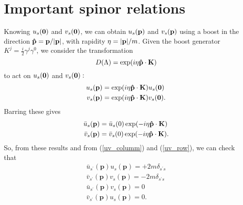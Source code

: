 \section{Important spinor relations}
Knowing $u_s(\vb{0})$ and $v_s(\vb{0})$, we can obtain $u_s(\vb{p})$ and $v_s(\vb{p})$ using a boost in the direction $\vu{p}=\vb{p}/\abs{\vb{p}}$, with rapidity $\eta=\abs{\vb{p}}/m$. Given the boost generator $K^j=\frac{i}{2}\gamma^j\gamma^0$, we consider the transformation
\begin{equation}
    D(\Lambda)=\exp(i\eta\vu{p}\cdot\vb{K})
\end{equation}
to act on $u_s(\vb{0})$ and $v_s(\vb{0}):$
\begin{equation}
    \begin{aligned}
        u_s(\vb{p})&=\exp(i\eta\vu{p}\cdot \vb{K})u_s(\vb{0})\\
        v_s(\vb{p})&=\exp(i\eta\vu{p}\cdot \vb{K})v_s(\vb{0}).
    \end{aligned}
\end{equation}
Barring these gives
\begin{equation}
    \begin{aligned}
        \bar{u}_s(\vb{p})&=\bar{u}_s(0)\exp(-i\eta\vu{p}\cdot \vb{K})\\
        \bar{v}_s(\vb{p})&=\bar{v}_s(0)\exp(-i\eta\vu{p}\cdot \vb{K}).
    \end{aligned}
\end{equation}
So, from these results and from (\ref{uv_columm}) and (\ref{uv_row}), we can check that
\begin{equation}
\begin{array}{l}
\bar{u}_{s^{\prime}}(\mathbf{p}) u_{s}(\mathbf{p})=+2 m \delta_{s^{\prime} s} \\
\bar{v}_{s^{\prime}}(\mathbf{p}) v_{s}(\mathbf{p})=-2 m \delta_{s^{\prime} s} \\
\bar{u}_{s^{\prime}}(\mathbf{p}) v_{s}(\mathbf{p})=0 \\
\bar{v}_{s^{\prime}}(\mathbf{p}) u_{s}(\mathbf{p})=0.
\end{array}
\end{equation}

